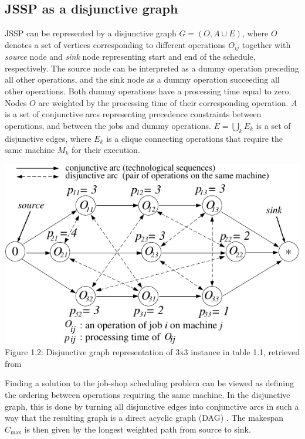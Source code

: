 \subsection{JSSP as a disjunctive graph} \label{JSSP as a disjunctive graph}

JSSP can be represented by a disjunctive graph \cite{YamadaNakanoJSSP, BLAZEWICZ2000317} $G = ( O, A \cup E )$, where $O$ denotes a set of vertices corresponding to different operations $O_{ij}$ together with \textit{source} node and \textit{sink} node representing start and end of the schedule, respectively. The source node can be interpreted as a dummy operation preceding all other operations, and the sink node as a dummy operation succeeding all other operations. Both dummy operations have a processing time equal to zero. Nodes $O$ are weighted by the processing time of their corresponding operation. $A$ is a set of conjunctive arcs representing precedence constraints between operations, and between the jobs and dummy operations. $E = \bigcup_{k} E_k$ is a set of disjunctive edges, where $E_k$ is a clique connecting operations that require the same machine $M_k$ for their execution.
\begin{center}
    \includegraphics[width=0.75\linewidth]{images/jssp_disjunctive_graph.pdf}\\
    Figure 1.2: Disjunctive graph representation of 3x3 instance in table 1.1, retrieved from \cite{YamadaNakanoJSSP}
\end{center}

Finding a solution to the job-shop scheduling problem can be viewed as defining the ordering between operations requiring the same machine. In the disjunctive graph, this is done by turning all disjunctive edges into conjunctive arcs \cite{YamadaNakanoJSSP, BLAZEWICZ2000317} in such a way that the resulting graph is a direct acyclic graph (DAG) \cite{doi:10.1287/opre.17.6.941}. The makespan $C_\text{max}$ is then given by the longest weighted path from source to sink.

